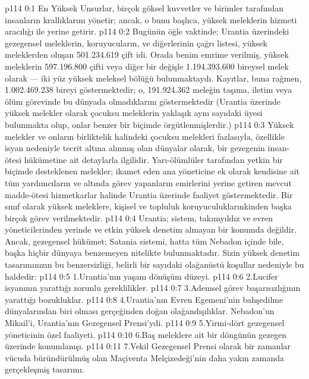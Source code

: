\vs p114 0:1 En Yüksek Unsurlar, birçok göksel kuvvetler ve birimler tarafından insanların krallıklarını yönetir; ancak, o bunu başlıca, yüksek meleklerin hizmeti aracılığı ile yerine getirir.
\vs p114 0:2 Bugünün öğle vaktinde; Urantia üzerindeki gezegensel meleklerin, koruyucuların, ve diğerlerinin çağrı listesi, yüksek meleklerden oluşan 501.234.619 çift idi. Orada benim emrime verilmiş, yüksek meleklerin 597.196.800 çifti veya diğer bir değişle 1.194.393.600 bireysel melek olarak --- iki yüz yüksek meleksel bölüğü bulunmaktaydı. Kayıtlar, buna rağmen, 1.002.469.238 bireyi göstermektedir; o, 191.924.362 meleğin taşıma, iletim veya ölüm görevinde bu dünyada olmadıklarını göstermektedir (Urantia üzerinde yüksek melekler olarak çocuksu meleklerin yaklaşık aynı sayıdaki üyesi bulunmakta olup, onlar benzer bir biçimde örgütlenmişlerdir.)
\vs p114 0:3 Yüksek melekler ve onların birliktelik halindeki çocuksu melekleri fazlasıyla, özellikle isyan nedeniyle tecrit altına alınmış olan dünyalar olarak, bir gezegenin insan\hyp{}ötesi hükümetine ait detaylarla ilgilidir. Yarı\hyp{}ölümlüler tarafından yetkin bir biçimde desteklenen melekler; ikamet eden ana yöneticine ek olarak kendisine ait tüm yardımcıların ve altında görev yapanların emirlerini yerine getiren mevcut madde\hyp{}ötesi hizmetkarlar halinde Urantia üzerinde faaliyet göstermektedir. Bir sınıf olarak yüksek meleklere, kişisel ve topluluk koruyuculuklarınkinden başka birçok görev verilmektedir.
\vs p114 0:4 Urantia; sistem, takımyıldız ve evren yöneticilerinden yerinde ve etkin yüksek denetim almayan bir konumda değildir. Ancak, gezegensel hükümet; Satania sistemi, hatta tüm Nebadon içinde bile, başka hiçbir dünyaya benzemeyen nitelikte bulunmaktadır. Sizin yüksek denetim tasarımınızın bu benzersizliği, belirli bir sayıdaki olağanüstü koşullar nedeniyle bu haldedir:
\vs p114 0:5 1.\bibnobreakspace Urantia’nın yaşam dönüşüm düzeyi.
\vs p114 0:6 2.\bibnobreakspace Lucifer isyanının yarattığı zorunlu gereklilikler.
\vs p114 0:7 3.\bibnobreakspace Ademsel görev başarısızlığının yarattığı bozukluklar.
\vs p114 0:8 4.\bibnobreakspace Urantia’nın Evren Egemeni’nin bahşedilme dünyalarından biri olması gerçeğinden doğan olağandışılıklar. Nebadon’un Mikail’i, Urantia’nın Gezegensel Prensi’ydi.
\vs p114 0:9 5.\bibnobreakspace Yirmi\hyp{}dört gezegensel yöneticinin özel faaliyeti.
\vs p114 0:10 6.\bibnobreakspace Baş meleklere ait bir döngünün gezegen üzerinde konumlanışı.
\vs p114 0:11 7.\bibnobreakspace Vekil Gezegensel Prensi olarak bir zamanlar vücuda büründürülmüş olan Maçiventa Melçizedeği’nin daha yakın zamanda gerçekleşmiş tasarımı.
